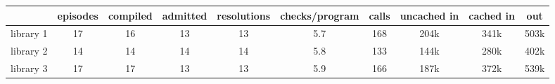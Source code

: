 \begin{tabular}{lccccccccc}
\toprule
& episodes & compiled & admitted & resolutions & checks/program & calls & uncached in & cached in & out \\
\midrule
library 1 & 17 & 16 & 13 & 13 & 5.7 & 168 & 204k & 341k & 503k \\
library 2 & 14 & 14 & 14 & 14 & 5.8 & 133 & 144k & 280k & 402k \\
library 3 & 17 & 17 & 13 & 13 & 5.9 & 166 & 187k & 372k & 539k \\
\bottomrule
\end{tabular}
